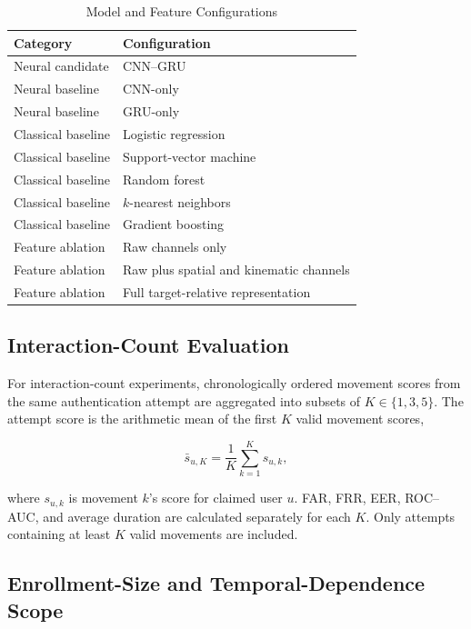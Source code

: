 \documentclass[conference]{IEEEtran}
\begin{document}
\begin{table}[t]
\centering
\caption{Model and Feature Configurations}
\label{tab:experimental_configurations}
\begin{tabular}{ll}
\toprule
\textbf{Category} & \textbf{Configuration} \\
\midrule
Neural candidate & CNN--GRU \\
Neural baseline & CNN-only \\
Neural baseline & GRU-only \\
Classical baseline & Logistic regression \\
Classical baseline & Support-vector machine \\
Classical baseline & Random forest \\
Classical baseline & $k$-nearest neighbors \\
Classical baseline & Gradient boosting \\
Feature ablation & Raw channels only \\
Feature ablation & Raw plus spatial and kinematic channels \\
Feature ablation & Full target-relative representation \\
\bottomrule
\end{tabular}
\end{table}



\subsection{Interaction-Count Evaluation}

For interaction-count experiments, chronologically ordered movement scores from the same authentication attempt are aggregated into subsets of $K\in\{1,3,5\}$. The attempt score is the arithmetic mean of the first $K$ valid movement scores,

\begin{equation}
\bar{s}_{u,K}=\frac{1}{K}\sum_{k=1}^{K}s_{u,k},
\label{eq:aggregate_score}
\end{equation}

where $s_{u,k}$ is movement $k$'s score for claimed user $u$. FAR, FRR,
EER, ROC--AUC, and average duration are calculated separately for each $K$.
Only attempts containing at least $K$ valid movements are included.

\subsection{Enrollment-Size and Temporal-Dependence Scope}
\label{sec:scope_controls}
\end{document}
